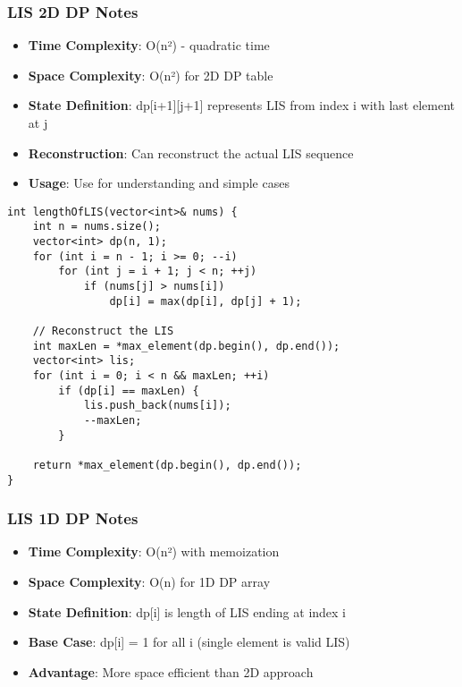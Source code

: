 \documentclass[11pt,a4paper]{article}
\begin{document}
\subsubsection{LIS 2D DP Notes}
\begin{itemize}
\item \textbf{Time Complexity}: O(n²) - quadratic time
\item \textbf{Space Complexity}: O(n²) for 2D DP table
\item \textbf{State Definition}: dp[i+1][j+1] represents LIS from index i with last element at j
\item \textbf{Reconstruction}: Can reconstruct the actual LIS sequence
\item \textbf{Usage}: Use for understanding and simple cases
\end{itemize}

\newpage
\begin{lstlisting}[caption={LIS - 1D DP Bottom-Up Implementation}]
int lengthOfLIS(vector<int>& nums) {
    int n = nums.size();
    vector<int> dp(n, 1);
    for (int i = n - 1; i >= 0; --i)
        for (int j = i + 1; j < n; ++j)
            if (nums[j] > nums[i])
                dp[i] = max(dp[i], dp[j] + 1);

    // Reconstruct the LIS
    int maxLen = *max_element(dp.begin(), dp.end());
    vector<int> lis;
    for (int i = 0; i < n && maxLen; ++i)
        if (dp[i] == maxLen) {
            lis.push_back(nums[i]);
            --maxLen;
        }

    return *max_element(dp.begin(), dp.end());
}
\end{lstlisting}

\subsubsection{LIS 1D DP Notes}
\begin{itemize}
\item \textbf{Time Complexity}: O(n²) with memoization
\item \textbf{Space Complexity}: O(n) for 1D DP array
\item \textbf{State Definition}: dp[i] is length of LIS ending at index i
\item \textbf{Base Case}: dp[i] = 1 for all i (single element is valid LIS)
\item \textbf{Advantage}: More space efficient than 2D approach
\end{itemize}
\end{document}
